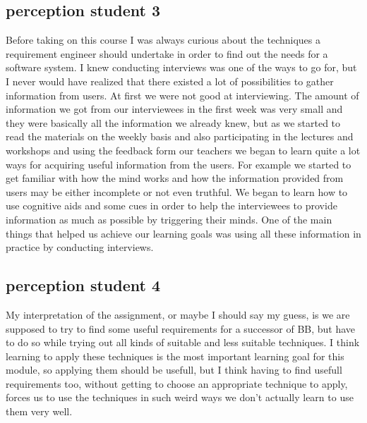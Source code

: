\subsection{perception student 3}
Before taking on this course I was always curious about the techniques a requirement engineer
should undertake in order to find out the needs for a software system. I knew conducting interviews
was one of the ways to go for, but I never would have realized that there existed a lot of possibilities
to gather information from users. At first we were not good at interviewing. The amount of
information we got from our interviewees in the first week was very small and they were basically all
the information we already knew, but as we started to read the materials on the weekly basis and
also participating in the lectures and workshops and using the feedback form our teachers we began
to learn quite a lot ways for acquiring useful information from the users. For example we started to
get familiar with how the mind works and how the information provided from users may be either
incomplete or not even truthful. We began to learn how to use cognitive aids and some cues in order
to help the interviewees to provide information as much as possible by triggering their minds. One of
the main things that helped us achieve our learning goals was using all these information in practice
by conducting interviews.

\subsection{perception student 4}
My interpretation of the assignment, or maybe I should say my guess, is we are supposed to try to find some useful requirements for a successor of BB, but have to do so while trying out all kinds of suitable and less suitable techniques. I think learning to apply these techniques is the most important learning goal for this module, so applying them should be usefull, but I think having to find usefull requirements too, without getting to choose an appropriate technique to apply, forces us to use the techniques in such weird ways we don't actually learn to use them very well.

